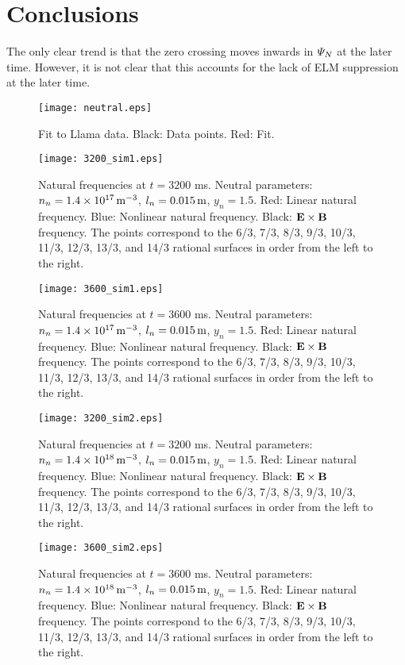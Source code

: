 \documentclass[12pt]{article}
\begin{document}
\section{Conclusions}
The only clear trend is that the zero crossing moves inwards in ${\mit\Psi}_N$ at the later time. However, it is not clear that this
accounts for the lack of ELM suppression at the later time. 

\begin{figure}
\centering
\texttt{[image: neutral.eps]}
\caption{Fit to Llama data. Black: Data points. Red: Fit.}\label{fig1}
\end{figure}



\begin{figure}
\centering
\texttt{[image: 3200\_sim1.eps]}
\caption{Natural frequencies at $t=3200$ ms. Neutral parameters: $n_n= 1.4\times 10^{17}\,{\rm m}^{-3}$, $l_n= 0.015\,{\rm m}$, $y_n=1.5$. Red: Linear natural frequency. Blue: Nonlinear natural frequency. Black: ${\bf E}\times {\bf B}$ frequency. The points correspond to the
6/3, 7/3, 8/3, 9/3, 10/3, 11/3, 12/3, 13/3, and 14/3 rational surfaces in order from the left to the right.}\label{fig2}
\end{figure}

\begin{figure}
\centering
\texttt{[image: 3600\_sim1.eps]}
\caption{Natural frequencies at $t=3600$ ms. Neutral parameters: $n_n= 1.4\times 10^{17}\,{\rm m}^{-3}$, $l_n= 0.015\,{\rm m}$, $y_n=1.5$. Red: Linear natural frequency. Blue: Nonlinear natural frequency. Black: ${\bf E}\times {\bf B}$ frequency. The points correspond to the
6/3, 7/3, 8/3, 9/3, 10/3, 11/3, 12/3, 13/3, and 14/3 rational surfaces in order from the left to the right.}\label{fig3}
\end{figure}

\begin{figure}
\centering
\texttt{[image: 3200\_sim2.eps]}
\caption{Natural frequencies at $t=3200$ ms. Neutral parameters: $n_n= 1.4\times 10^{18}\,{\rm m}^{-3}$, $l_n= 0.015\,{\rm m}$, $y_n=1.5$. Red: Linear natural frequency. Blue: Nonlinear natural frequency. Black: ${\bf E}\times {\bf B}$ frequency. The points correspond to the
6/3, 7/3, 8/3, 9/3, 10/3, 11/3, 12/3, 13/3, and 14/3 rational surfaces in order from the left to the right.}\label{fig4}
\end{figure}

\begin{figure}
\centering
\texttt{[image: 3600\_sim2.eps]}
\caption{Natural frequencies at $t=3600$ ms. Neutral parameters: $n_n= 1.4\times 10^{18}\,{\rm m}^{-3}$, $l_n= 0.015\,{\rm m}$, $y_n=1.5$. Red: Linear natural frequency. Blue: Nonlinear natural frequency. Black: ${\bf E}\times {\bf B}$ frequency. The points correspond to the
6/3, 7/3, 8/3, 9/3, 10/3, 11/3, 12/3, 13/3, and 14/3 rational surfaces in order from the left to the right.}\label{fig5}
\end{figure}
\end{document}
